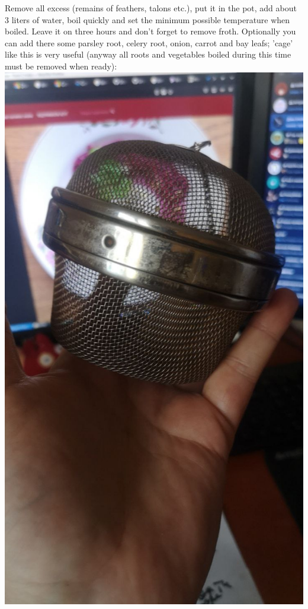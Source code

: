 \documentclass[11pt,a4paper]{article}
\begin{document}
Remove all excess (remains of feathers, talons etc.), put it in the pot, add about 3 liters of water, boil quickly and set the minimum possible temperature when boiled. Leave it on three hours and don't forget to remove froth. Optionally you can add there some parsley root, celery root, onion, carrot and bay leafs; 'cage' like this is very useful (anyway all roots and vegetables boiled during this time must be removed when ready):\\
\includegraphics[width=\textwidth]{2.jpg}
\end{document}
